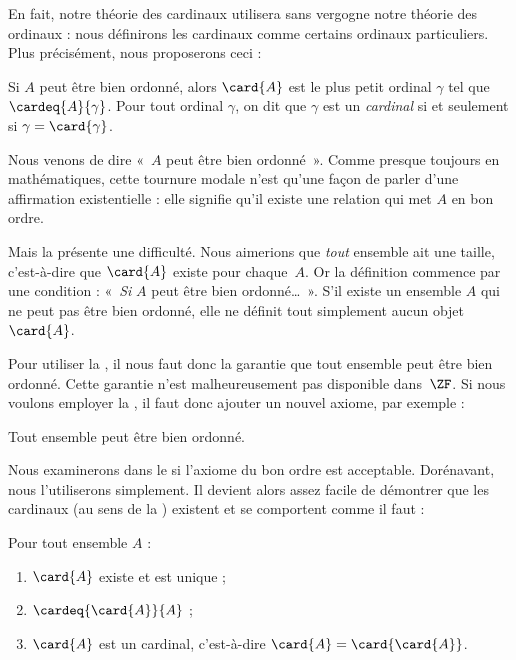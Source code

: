 \documentclass[../../../include/open-logic-section]{subfiles}
\begin{document}

En fait, notre théorie des cardinaux utilisera sans
vergogne notre théorie des ordinaux : nous définirons
les cardinaux comme certains ordinaux particuliers.
Plus précisément, nous proposerons ceci :

\begin{defn}
Si $A$ peut être bien ordonné, alors $\card{A}$
est le plus petit ordinal $\gamma$ tel que
$\cardeq{A}{\gamma}$. Pour tout ordinal $\gamma$,
on dit que $\gamma$ est un \emph{cardinal} si
et seulement si $\gamma = \card{\gamma}$.
\end{defn}

Nous venons de dire «~$A$ peut être bien ordonné~».
Comme presque toujours en mathématiques, cette tournure
modale n'est qu'une façon de parler d'une affirmation
existentielle : elle signifie qu'il existe une relation
qui met $A$ en bon ordre.

Mais la  présente une difficulté.
Nous aimerions que \emph{tout} ensemble ait une taille,
c'est-à-dire que $\card{A}$ existe pour chaque~$A$.
Or la définition commence par une condition :
«~\emph{Si} $A$ peut être bien ordonné\ldots~».
S'il existe un ensemble $A$ qui ne peut pas être
bien ordonné, elle ne définit tout simplement aucun
objet~$\card{A}$.

Pour utiliser la ,
il nous faut donc la garantie que tout ensemble
peut être bien ordonné. Cette garantie n'est
malheureusement pas disponible dans~$\ZF$.
Si nous voulons employer
la , il faut donc
ajouter un nouvel axiome, par exemple :
\begin{axiom}
Tout ensemble peut être bien ordonné.
\end{axiom}
Nous examinerons dans le
 si l'axiome du bon ordre
est acceptable. Dorénavant, nous l'utiliserons
simplement. Il devient alors assez facile de
démontrer que les cardinaux (au sens de la
) existent et se
comportent comme il faut :

\begin{lem}
Pour tout ensemble $A$ :
\begin{enumerate}
	\item{}
	$\card{A}$ existe et est unique ;
	\item{}
	$\cardeq{\card{A}}{A}$ ;
	\item{}
	$\card{A}$ est un cardinal, c'est-à-dire
	$\card{A} = \card{\card{A}}$.
\end{enumerate}
\end{lem}
\end{document}
